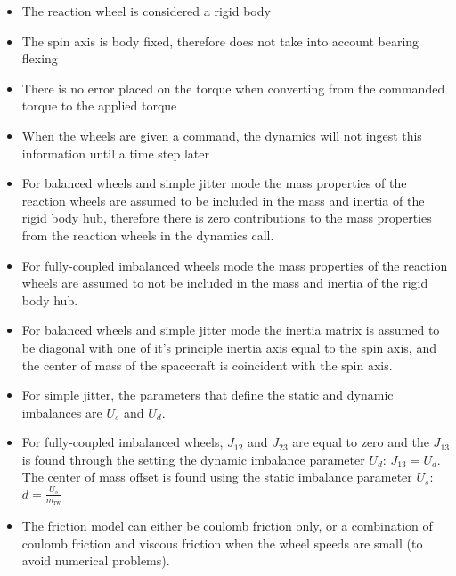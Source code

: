 \begin{itemize}
	\item The reaction wheel is considered a rigid body
	\item The spin axis is body fixed, therefore does not take into account bearing flexing
	\item There is no error placed on the torque when converting from the commanded torque to the applied torque
	\item When the wheels are given a command, the dynamics will not ingest this information until a time step later
	\item For balanced wheels and simple jitter mode the mass properties of the reaction wheels are assumed to be included in the mass and inertia of the rigid body hub, therefore there is zero contributions to the mass properties from the reaction wheels in the dynamics call. 
	\item For fully-coupled imbalanced wheels mode the mass properties of the reaction wheels are assumed to not be included in the mass and inertia of the rigid body hub. 
	\item For balanced wheels and simple jitter mode the inertia matrix is assumed to be diagonal with one of it's principle inertia axis equal to the spin axis, and the center of mass of the spacecraft is coincident with the spin axis. 
	\item For simple jitter, the parameters that define the static and dynamic imbalances are $U_s$ and $U_d$.
	\item For fully-coupled imbalanced wheels, $J_{12}$ and $J_{23}$ are equal to zero and the $J_{13}$ is found through the setting the dynamic imbalance parameter $U_d$: $J_{13} = U_d$. The center of mass offset is found using the static imbalance parameter $U_s$: $d = \frac{U_s}{m_{\text{rw}}}$
	\item The friction model can either be coulomb friction only, or a combination of coulomb friction and viscous friction when the wheel speeds are small (to avoid numerical problems). 
\end{itemize}